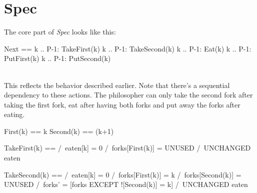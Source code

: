 \section{Spec}

The core part of \textit{Spec} looks like this: 
\\
\begin{tla}
Next ==
    \/ \E k .. P-1:
        TakeFirst(k)
    \/ \E k .. P-1:
        TakeSecond(k)
    \/ \E k .. P-1:
        Eat(k)
    \/ \E k .. P-1:
        PutFirst(k)
    \/ \E k .. P-1:
        PutSecond(k)
\end{tla}
\begin{tlatex}
%
%
%
%
%
%
%
%
%
%
%
\end{tlatex}
\\

This reflects the behavior described earlier. Note that there's a sequential
dependency to these actions. The philosopher can only take the second fork after
taking the first fork, eat after having both forks and put away the forks after
eating.\\

\begin{tla}

First(k) == k
Second(k) == (k+1)%

TakeFirst(k) == 
    /\ eaten[k] = 0
    /\ forks[First(k)] = UNUSED
    /\ UNCHANGED eaten

TakeSecond(k) ==
    /\ eaten[k] = 0
    /\ forks[First(k)] = k
    /\ forks[Second(k)] = UNUSED
    /\ forks' = [forks EXCEPT ![Second(k)] = k]
    /\ UNCHANGED eaten
\end{tla}
\begin{tlatex}
%
%
\@pvspace{8.0pt}%
%
%
%
%
\@pvspace{8.0pt}%
%
%
%
%
%
\end{tlatex}
\\

